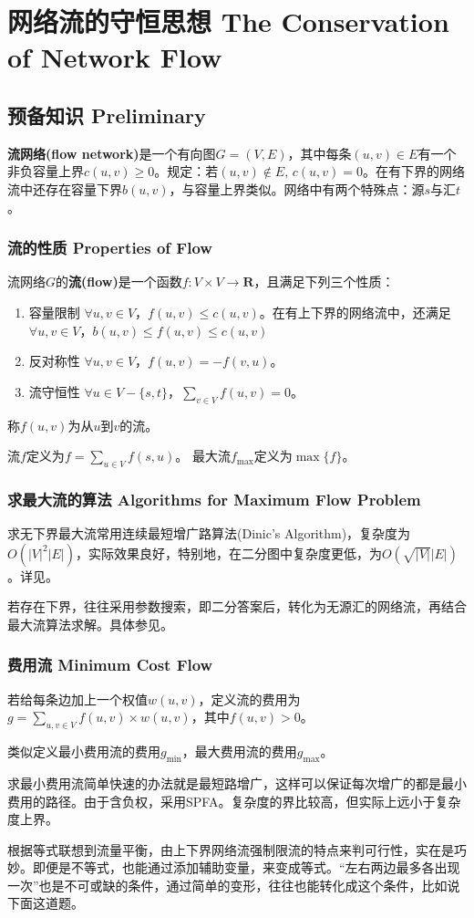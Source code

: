 \section{网络流的守恒思想 The Conservation of Network Flow}
\subsection{预备知识 Preliminary}
\textbf{流网络(flow network)}是一个有向图$G = (V, E)$，其中每条$(u, v) \in E$有一个非负容量上界$c(u, v) \ge 0$。规定：若$(u, v) \notin E, \, c(u, v) = 0$。在有下界的网络流中还存在容量下界$b(u, v)$，与容量上界类似。网络中有两个特殊点：源$s$与汇$t$。
\subsubsection{流的性质 Properties of Flow}
\par 流网络$G$的\textbf{流(flow)}是一个函数$f : V \times V \to \mathbf{R}$，且满足下列三个性质：
\begin{enumerate}
\item 容量限制 \quad $\forall u, v \in V$，$f(u, v) \leq c(u, v)$。在有上下界的网络流中，还满足$\forall u, v \in V$，$b(u, v) \le f(u, v) \leq c(u, v)$
\item 反对称性 \quad $\forall u, v \in V$，$f(u, v) = -f(v, u)$。
\item 流守恒性 \quad $\forall u \in V - \{s, t\}$，$\sum_{v \in V}{f(u, v)} = 0$。
\end{enumerate}
\par 称$f(u, v)$为从$u$到$v$的流。
\par 流$f$定义为$f = \sum_{u \in V} f(s, u)$。
最大流$f_{\text{max}}$定义为$\max\{f\}$。
\subsubsection{求最大流的算法 Algorithms for Maximum Flow Problem}
\par 求无下界最大流常用连续最短增广路算法(Dinic's Algorithm)，复杂度为$O(|V|^2|E|)$，实际效果良好，特别地，在二分图中复杂度更低，为$O(\sqrt{|V|}|E|)$。详见\cite{wxs2007}。
\par 若存在下界，往往采用参数搜索，即二分答案后，转化为无源汇的网络流，再结合最大流算法求解。具体参见\cite{zy2004}。
\subsubsection{费用流 Minimum Cost Flow}
若给每条边加上一个权值$w(u, v)$，定义流的费用为$g = \sum_{u, v \in V}{f(u, v) \times w(u, v)}$，其中$f(u, v) > 0$。
\par 类似定义最小费用流的费用$g_{\text{min}}$，最大费用流的费用$g_{\text{max}}$。
\par 求最小费用流简单快速的办法就是最短路增广，这样可以保证每次增广的都是最小费用的路径。由于含负权，采用SPFA。复杂度的界比较高，但实际上远小于复杂度上界。



\vspace{10pt} \par 根据等式联想到流量平衡，由上下界网络流强制限流的特点来判可行性，实在是巧妙。即便是不等式，也能通过添加辅助变量，来变成等式。“左右两边最多各出现一次”也是不可或缺的条件，通过简单的变形，往往也能转化成这个条件，比如说下面这道题。


